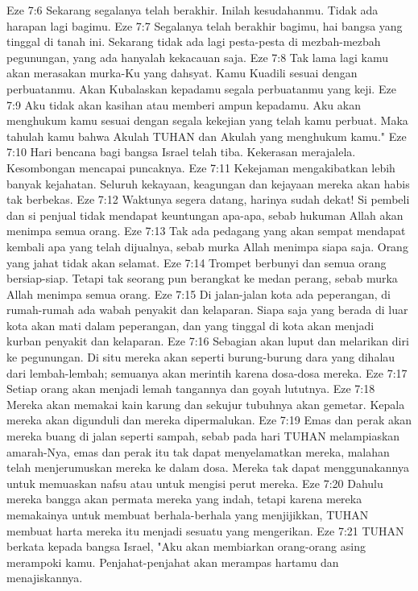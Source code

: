 Eze 7:6  Sekarang segalanya telah berakhir. Inilah kesudahanmu. Tidak ada harapan lagi bagimu.
Eze 7:7  Segalanya telah berakhir bagimu, hai bangsa yang tinggal di tanah ini. Sekarang tidak ada lagi pesta-pesta di mezbah-mezbah pegunungan, yang ada hanyalah kekacauan saja.
Eze 7:8  Tak lama lagi kamu akan merasakan murka-Ku yang dahsyat. Kamu Kuadili sesuai dengan perbuatanmu. Akan Kubalaskan kepadamu segala perbuatanmu yang keji.
Eze 7:9  Aku tidak akan kasihan atau memberi ampun kepadamu. Aku akan menghukum kamu sesuai dengan segala kekejian yang telah kamu perbuat. Maka tahulah kamu bahwa Akulah TUHAN dan Akulah yang menghukum kamu."
Eze 7:10  Hari bencana bagi bangsa Israel telah tiba. Kekerasan merajalela. Kesombongan mencapai puncaknya.
Eze 7:11  Kekejaman mengakibatkan lebih banyak kejahatan. Seluruh kekayaan, keagungan dan kejayaan mereka akan habis tak berbekas.
Eze 7:12  Waktunya segera datang, harinya sudah dekat! Si pembeli dan si penjual tidak mendapat keuntungan apa-apa, sebab hukuman Allah akan menimpa semua orang.
Eze 7:13  Tak ada pedagang yang akan sempat mendapat kembali apa yang telah dijualnya, sebab murka Allah menimpa siapa saja. Orang yang jahat tidak akan selamat.
Eze 7:14  Trompet berbunyi dan semua orang bersiap-siap. Tetapi tak seorang pun berangkat ke medan perang, sebab murka Allah menimpa semua orang.
Eze 7:15  Di jalan-jalan kota ada peperangan, di rumah-rumah ada wabah penyakit dan kelaparan. Siapa saja yang berada di luar kota akan mati dalam peperangan, dan yang tinggal di kota akan menjadi kurban penyakit dan kelaparan.
Eze 7:16  Sebagian akan luput dan melarikan diri ke pegunungan. Di situ mereka akan seperti burung-burung dara yang dihalau dari lembah-lembah; semuanya akan merintih karena dosa-dosa mereka.
Eze 7:17  Setiap orang akan menjadi lemah tangannya dan goyah lututnya.
Eze 7:18  Mereka akan memakai kain karung dan sekujur tubuhnya akan gemetar. Kepala mereka akan digunduli dan mereka dipermalukan.
Eze 7:19  Emas dan perak akan mereka buang di jalan seperti sampah, sebab pada hari TUHAN melampiaskan amarah-Nya, emas dan perak itu tak dapat menyelamatkan mereka, malahan telah menjerumuskan mereka ke dalam dosa. Mereka tak dapat menggunakannya untuk memuaskan nafsu atau untuk mengisi perut mereka.
Eze 7:20  Dahulu mereka bangga akan permata mereka yang indah, tetapi karena mereka memakainya untuk membuat berhala-berhala yang menjijikkan, TUHAN membuat harta mereka itu menjadi sesuatu yang mengerikan.
Eze 7:21  TUHAN berkata kepada bangsa Israel, "Aku akan membiarkan orang-orang asing merampoki kamu. Penjahat-penjahat akan merampas hartamu dan menajiskannya.
